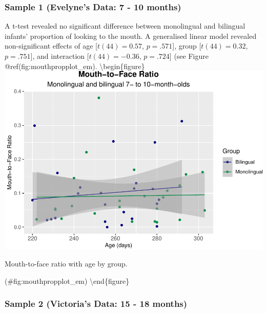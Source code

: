 \documentclass[english,man,floatsintext]{apa6}
\begin{document}
\hypertarget{sample-1-evelynes-data-7---10-months}{%
\subsubsection{Sample 1 (Evelyne's Data: 7 - 10 months)}\label{sample-1-evelynes-data-7---10-months}}

A t-test revealed no significant difference between monolingual and bilingual infants' proportion of looking to the mouth. A generalised linear model revealed non-significant effects of age {[}\(t(44) = 0.57\), \(p = .571\){]}, group {[}\(t(44) = 0.32\), \(p = .751\){]}, and interaction {[}\(t(44) = -0.36\), \(p = .724\){]} (see Figure @ref(fig:mouthpropplot\_em).
\textbackslash{}begin\{figure\}
\includegraphics{Effects_of_early_language_experience_on_infants_files/figure-latex/mouthpropplot_em-1}

\caption{Mouth-to-face ratio with age by group.}

(\#fig:mouthpropplot\_em)
\textbackslash{}end\{figure\}

\hypertarget{sample-2-victorias-data-15---18-months}{%
\subsubsection{Sample 2 (Victoria's Data: 15 - 18 months)}\label{sample-2-victorias-data-15---18-months}}
\end{document}
